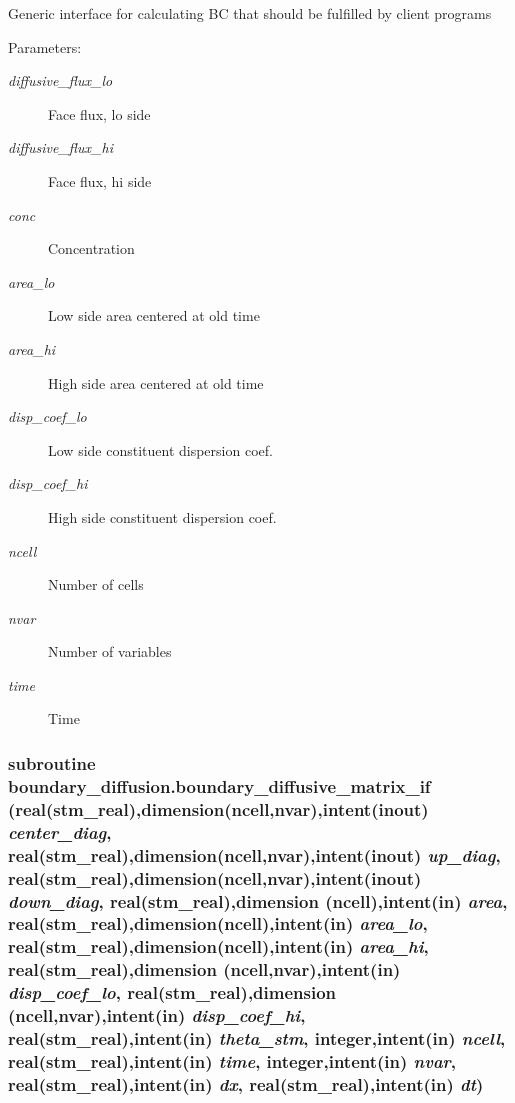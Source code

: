 Generic interface for calculating BC that should be fulfilled by client programs \begin{Desc}
\item[Parameters:]
\begin{description}
\item[{\em diffusive\_\-flux\_\-lo}]Face flux, lo side\item[{\em diffusive\_\-flux\_\-hi}]Face flux, hi side\item[{\em conc}]Concentration \item[{\em area\_\-lo}]Low side area centered at old time\item[{\em area\_\-hi}]High side area centered at old time\item[{\em disp\_\-coef\_\-lo}]Low side constituent dispersion coef.\item[{\em disp\_\-coef\_\-hi}]High side constituent dispersion coef.\item[{\em ncell}]Number of cells\item[{\em nvar}]Number of variables\item[{\em time}]Time \end{description}
\end{Desc}
\hypertarget{a00051_781f25a83683631c224d3f258b12590b}{
\subsubsection[{boundary\_\-diffusive\_\-matrix\_\-if}]{\setlength{\rightskip}{0pt plus 5cm}subroutine boundary\_\-diffusion.boundary\_\-diffusive\_\-matrix\_\-if (real(stm\_\-real),dimension(ncell,nvar),intent(inout) {\em center\_\-diag}, \/  real(stm\_\-real),dimension(ncell,nvar),intent(inout) {\em up\_\-diag}, \/  real(stm\_\-real),dimension(ncell,nvar),intent(inout) {\em down\_\-diag}, \/  real(stm\_\-real),dimension (ncell),intent(in) {\em area}, \/  real(stm\_\-real),dimension(ncell),intent(in) {\em area\_\-lo}, \/  real(stm\_\-real),dimension(ncell),intent(in) {\em area\_\-hi}, \/  real(stm\_\-real),dimension (ncell,nvar),intent(in) {\em disp\_\-coef\_\-lo}, \/  real(stm\_\-real),dimension (ncell,nvar),intent(in) {\em disp\_\-coef\_\-hi}, \/  real(stm\_\-real),intent(in) {\em theta\_\-stm}, \/  integer,intent(in) {\em ncell}, \/  real(stm\_\-real),intent(in) {\em time}, \/  integer,intent(in) {\em nvar}, \/  real(stm\_\-real),intent(in) {\em dx}, \/  real(stm\_\-real),intent(in) {\em dt})}}
\label{a00051_781f25a83683631c224d3f258b12590b}


